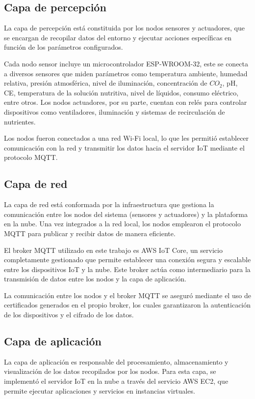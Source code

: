 \subsection{Capa de percepción}

La capa de percepción está constituida por los nodos sensores y actuadores, que
se encargan de recopilar datos del entorno y ejecutar acciones específicas en
función de los parámetros configurados.

Cada nodo sensor incluye un microcontrolador ESP-WROOM-32, este se conecta a
diversos sensores que miden parámetros como temperatura ambiente, humedad
relativa, presión atmosférica, nivel de iluminación, concentración de $CO_2$,
pH, CE, temperatura de la solución nutritiva, nivel de líquidos, consumo
eléctrico, entre otros. Los nodos actuadores, por su parte, cuentan con relés
para controlar dispositivos como ventiladores, iluminación y sistemas de
recirculación de nutrientes.

Los nodos fueron conectados a una red Wi-Fi local, lo que les permitió
establecer comunicación con la red y transmitir los datos hacia el servidor IoT
mediante el protocolo MQTT.

\subsection{Capa de red}

La capa de red está conformada por la infraestructura que gestiona la
comunicación entre los nodos del sistema (sensores y actuadores) y la
plataforma en la nube. Una vez integrados a la red local, los nodos emplearon
el protocolo MQTT para publicar y recibir datos de manera eficiente.

El broker MQTT utilizado en este trabajo es AWS IoT Core, un servicio
completamente gestionado que permite establecer una conexión segura y escalable
entre los dispositivos IoT y la nube. Este broker actúa como intermediario para
la transmisión de datos entre los nodos y la capa de aplicación.

La comunicación entre los nodos y el broker MQTT se aseguró mediante el uso de
certificados generados en el propio broker, los cuales garantizaron la
autenticación de los dispositivos y el cifrado de los datos.

\subsection{Capa de aplicación}

La capa de aplicación es responsable del procesamiento, almacenamiento y
visualización de los datos recopilados por los nodos. Para esta capa, se
implementó el servidor IoT en la nube a través del servicio AWS EC2, que
permite ejecutar aplicaciones y servicios en instancias virtuales.

